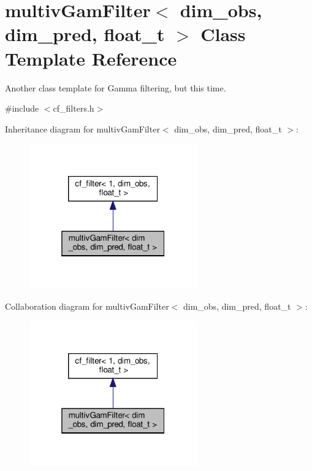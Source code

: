 \hypertarget{classmultivGamFilter}{}\section{multiv\+Gam\+Filter$<$ dim\+\_\+obs, dim\+\_\+pred, float\+\_\+t $>$ Class Template Reference}
\label{classmultivGamFilter}


Another class template for Gamma filtering, but this time.  




{\ttfamily \#include $<$cf\+\_\+filters.\+h$>$}



Inheritance diagram for multiv\+Gam\+Filter$<$ dim\+\_\+obs, dim\+\_\+pred, float\+\_\+t $>$\+:
\nopagebreak
\begin{figure}[H]
\begin{center}
\leavevmode
\includegraphics[width=205pt]{classmultivGamFilter__inherit__graph}
\end{center}
\end{figure}


Collaboration diagram for multiv\+Gam\+Filter$<$ dim\+\_\+obs, dim\+\_\+pred, float\+\_\+t $>$\+:
\nopagebreak
\begin{figure}[H]
\begin{center}
\leavevmode
\includegraphics[width=205pt]{classmultivGamFilter__coll__graph}
\end{center}
\end{figure}
